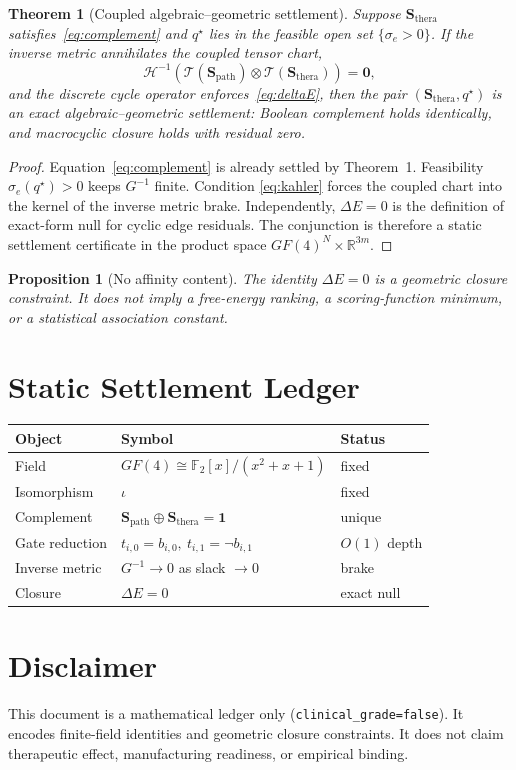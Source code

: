\documentclass[11pt,a4paper]{article}
\newtheorem{proposition}{Proposition}
\newtheorem{theorem}{Theorem}
\begin{document}
\begin{theorem}[Coupled algebraic--geometric settlement]
Suppose \(\mathbf{S}_{\mathrm{thera}}\) satisfies~\eqref{eq:complement} and
\(q^\star\) lies in the feasible open set \(\{\sigma_e>0\}\). If the inverse
metric annihilates the coupled tensor chart,
\begin{equation}
  \label{eq:kahler}
  \mathcal{H}^{-1}\!\left(
    \mathcal{T}(\mathbf{S}_{\mathrm{path}})
    \otimes
    \mathcal{T}(\mathbf{S}_{\mathrm{thera}})
  \right)
  =\mathbf{0},
\end{equation}
and the discrete cycle operator enforces~\eqref{eq:deltaE}, then the pair
\((\mathbf{S}_{\mathrm{thera}},q^\star)\) is an exact algebraic--geometric
settlement: Boolean complement holds identically, and macrocyclic closure
holds with residual zero.
\end{theorem}

\begin{proof}
Equation~\eqref{eq:complement} is already settled by Theorem~1.
Feasibility \(\sigma_e(q^\star)>0\) keeps \(G^{-1}\) finite. Condition
\eqref{eq:kahler} forces the coupled chart into the kernel of the inverse
metric brake. Independently, \(\Delta E=0\) is the definition of exact-form
null for cyclic edge residuals. The conjunction is therefore a static
settlement certificate in the product space
\(GF(4)^N\times\mathbb{R}^{3m}\).
\end{proof}

\begin{proposition}[No affinity content]
The identity \(\Delta E=0\) is a geometric closure constraint. It does not
imply a free-energy ranking, a scoring-function minimum, or a statistical
association constant.
\end{proposition}

\section{Static Settlement Ledger}

\begin{center}
\begin{tabular}{@{}lll@{}}
\toprule
Object & Symbol & Status\\
\midrule
Field & \(GF(4)\cong\mathbb{F}_2[x]/(x^2+x+1)\) & fixed\\
Isomorphism & \(\iota\) & fixed\\
Complement & \(\mathbf{S}_{\mathrm{path}}\oplus\mathbf{S}_{\mathrm{thera}}=\mathbf{1}\) & unique\\
Gate reduction & \(t_{i,0}=b_{i,0},\ t_{i,1}=\neg b_{i,1}\) & \(O(1)\) depth\\
Inverse metric & \(G^{-1}\to 0\) as slack \(\to 0\) & brake\\
Closure & \(\Delta E=0\) & exact null\\
\bottomrule
\end{tabular}
\end{center}

\section*{Disclaimer}
This document is a mathematical ledger only
(\texttt{clinical\_grade=false}). It encodes finite-field identities and
geometric closure constraints. It does not claim therapeutic effect,
manufacturing readiness, or empirical binding.
\end{document}

